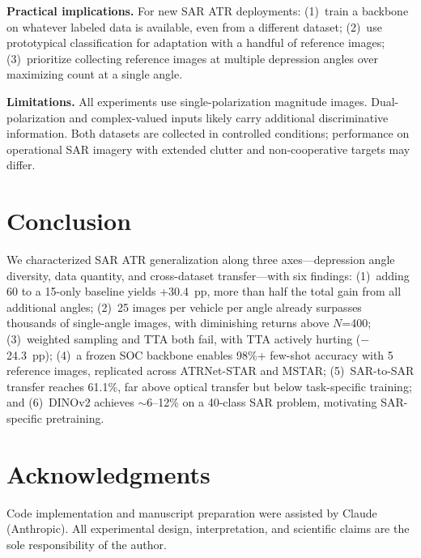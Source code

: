 \documentclass[journal]{IEEEtran}
\begin{document}
\textbf{Practical implications.} For new SAR ATR deployments: (1)~train a
backbone on whatever labeled data is available, even from a different dataset;
(2)~use prototypical classification for adaptation with a handful of reference
images; (3)~prioritize collecting reference images at multiple depression
angles over maximizing count at a single angle.

\textbf{Limitations.} All experiments use single-polarization magnitude
images. Dual-polarization and complex-valued inputs likely carry additional
discriminative information. Both datasets are collected in controlled
conditions; performance on operational SAR imagery with extended clutter
and non-cooperative targets may differ.

\section{Conclusion}

We characterized SAR ATR generalization along three axes---depression angle
diversity, data quantity, and cross-dataset transfer---with six findings:
(1)~adding 60\textdegree{} to a 15\textdegree{}-only baseline yields +30.4~pp,
more than half the total gain from all additional angles;
(2)~25 images per vehicle per angle already surpasses thousands of single-angle
images, with diminishing returns above $N$=400;
(3)~weighted sampling and TTA both fail, with TTA actively hurting
($-$24.3~pp);
(4)~a frozen SOC backbone enables 98\%+ few-shot accuracy with 5 reference
images, replicated across ATRNet-STAR and MSTAR;
(5)~SAR-to-SAR transfer reaches 61.1\%, far above optical transfer but
below task-specific training; and
(6)~DINOv2 achieves $\sim$6--12\% on a 40-class SAR problem, motivating
SAR-specific pretraining.

\section*{Acknowledgments}
Code implementation and manuscript preparation were assisted by Claude
(Anthropic). All experimental design, interpretation, and scientific claims
are the sole responsibility of the author.
\end{document}

